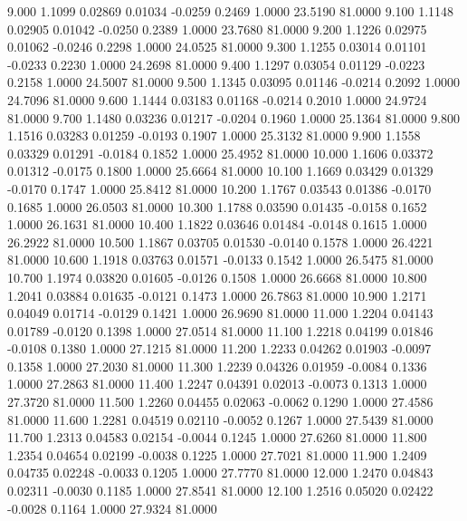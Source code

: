    9.000   1.1099   0.02869   0.01034  -0.0259   0.2469   1.0000  23.5190  81.0000
   9.100   1.1148   0.02905   0.01042  -0.0250   0.2389   1.0000  23.7680  81.0000
   9.200   1.1226   0.02975   0.01062  -0.0246   0.2298   1.0000  24.0525  81.0000
   9.300   1.1255   0.03014   0.01101  -0.0233   0.2230   1.0000  24.2698  81.0000
   9.400   1.1297   0.03054   0.01129  -0.0223   0.2158   1.0000  24.5007  81.0000
   9.500   1.1345   0.03095   0.01146  -0.0214   0.2092   1.0000  24.7096  81.0000
   9.600   1.1444   0.03183   0.01168  -0.0214   0.2010   1.0000  24.9724  81.0000
   9.700   1.1480   0.03236   0.01217  -0.0204   0.1960   1.0000  25.1364  81.0000
   9.800   1.1516   0.03283   0.01259  -0.0193   0.1907   1.0000  25.3132  81.0000
   9.900   1.1558   0.03329   0.01291  -0.0184   0.1852   1.0000  25.4952  81.0000
  10.000   1.1606   0.03372   0.01312  -0.0175   0.1800   1.0000  25.6664  81.0000
  10.100   1.1669   0.03429   0.01329  -0.0170   0.1747   1.0000  25.8412  81.0000
  10.200   1.1767   0.03543   0.01386  -0.0170   0.1685   1.0000  26.0503  81.0000
  10.300   1.1788   0.03590   0.01435  -0.0158   0.1652   1.0000  26.1631  81.0000
  10.400   1.1822   0.03646   0.01484  -0.0148   0.1615   1.0000  26.2922  81.0000
  10.500   1.1867   0.03705   0.01530  -0.0140   0.1578   1.0000  26.4221  81.0000
  10.600   1.1918   0.03763   0.01571  -0.0133   0.1542   1.0000  26.5475  81.0000
  10.700   1.1974   0.03820   0.01605  -0.0126   0.1508   1.0000  26.6668  81.0000
  10.800   1.2041   0.03884   0.01635  -0.0121   0.1473   1.0000  26.7863  81.0000
  10.900   1.2171   0.04049   0.01714  -0.0129   0.1421   1.0000  26.9690  81.0000
  11.000   1.2204   0.04143   0.01789  -0.0120   0.1398   1.0000  27.0514  81.0000
  11.100   1.2218   0.04199   0.01846  -0.0108   0.1380   1.0000  27.1215  81.0000
  11.200   1.2233   0.04262   0.01903  -0.0097   0.1358   1.0000  27.2030  81.0000
  11.300   1.2239   0.04326   0.01959  -0.0084   0.1336   1.0000  27.2863  81.0000
  11.400   1.2247   0.04391   0.02013  -0.0073   0.1313   1.0000  27.3720  81.0000
  11.500   1.2260   0.04455   0.02063  -0.0062   0.1290   1.0000  27.4586  81.0000
  11.600   1.2281   0.04519   0.02110  -0.0052   0.1267   1.0000  27.5439  81.0000
  11.700   1.2313   0.04583   0.02154  -0.0044   0.1245   1.0000  27.6260  81.0000
  11.800   1.2354   0.04654   0.02199  -0.0038   0.1225   1.0000  27.7021  81.0000
  11.900   1.2409   0.04735   0.02248  -0.0033   0.1205   1.0000  27.7770  81.0000
  12.000   1.2470   0.04843   0.02311  -0.0030   0.1185   1.0000  27.8541  81.0000
  12.100   1.2516   0.05020   0.02422  -0.0028   0.1164   1.0000  27.9324  81.0000
